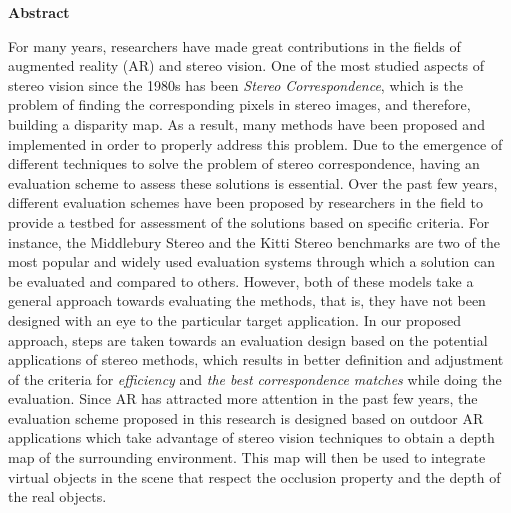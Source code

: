 \begin{center}
\textbf{\large Abstract}
\end{center}
For many years, researchers have made great contributions in the fields of augmented reality (AR) and stereo vision. 
One of the most studied aspects of stereo vision since the 1980s has been \textit{Stereo Correspondence}, which is the problem of 
finding the corresponding pixels in stereo images, and therefore, building a disparity map.
As a result, many methods have been proposed and implemented in order to properly address this problem. 
Due to the emergence of different techniques to solve the problem of stereo correspondence, having an evaluation scheme to assess 
these solutions is essential. Over the past few years, different evaluation schemes have been proposed 
by researchers in the field to provide a testbed for assessment of the solutions based on specific criteria.
For instance, the Middlebury Stereo and the Kitti Stereo benchmarks
are two of the most popular and widely used evaluation systems through which a solution can be evaluated and compared 
to others. 
However, both of these models take a general approach towards evaluating the methods, that is, they 
have not been designed with an eye to the particular target application.
In our proposed approach, steps are taken towards an evaluation design based on the potential applications of stereo methods, 
which results in better definition and adjustment of the criteria for \textit{efficiency} and 
\textit{the best correspondence matches} while doing the evaluation.
Since AR has attracted more attention in the past few years, 
the evaluation scheme proposed in this research is designed based on outdoor AR applications which take advantage of
stereo vision techniques to obtain a depth map of the surrounding environment. This map will then be used to
integrate virtual objects in the scene that respect the occlusion property and the depth of the real objects. 

